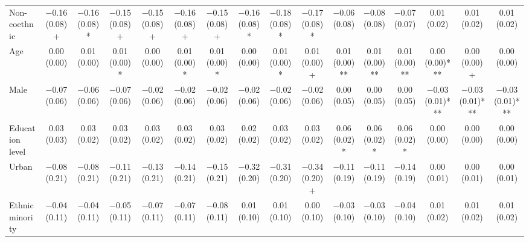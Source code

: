 \begin{table}[H]
\begin{tabular}[t]{lccccccccccccccc}
Non-coethnic & \num{-0.16} (\num{0.08})+ & \num{-0.16} (\num{0.08})* & \num{-0.15} (\num{0.08})+ & \num{-0.15} (\num{0.08})+ & \num{-0.16} (\num{0.08})+ & \num{-0.15} (\num{0.08})+ & \num{-0.16} (\num{0.08})* & \num{-0.18} (\num{0.08})* & \num{-0.17} (\num{0.08})* & \num{-0.06} (\num{0.08}) & \num{-0.08} (\num{0.08}) & \num{-0.07} (\num{0.07}) & \num{0.01} (\num{0.02}) & \num{0.01} (\num{0.02}) & \num{0.01} (\num{0.02})\\
Age & \num{0.00} (\num{0.00}) & \num{0.01} (\num{0.00}) & \num{0.01} (\num{0.00})* & \num{0.00} (\num{0.00}) & \num{0.01} (\num{0.00})* & \num{0.01} (\num{0.00})* & \num{0.00} (\num{0.00}) & \num{0.01} (\num{0.00})* & \num{0.01} (\num{0.00})+ & \num{0.01} (\num{0.00})** & \num{0.01} (\num{0.00})** & \num{0.01} (\num{0.00})** & \num{0.00} (\num{0.00})*** & \num{0.00} (\num{0.00})+ & \num{0.00} (\num{0.00})\\
Male & \num{-0.07} (\num{0.06}) & \num{-0.06} (\num{0.06}) & \num{-0.07} (\num{0.06}) & \num{-0.02} (\num{0.06}) & \num{-0.02} (\num{0.06}) & \num{-0.02} (\num{0.06}) & \num{-0.02} (\num{0.06}) & \num{-0.02} (\num{0.06}) & \num{-0.02} (\num{0.06}) & \num{0.00} (\num{0.05}) & \num{0.00} (\num{0.05}) & \num{0.00} (\num{0.05}) & \num{-0.03} (\num{0.01})*** & \num{-0.03} (\num{0.01})*** & \num{-0.03} (\num{0.01})***\\
Education level & \num{0.03} (\num{0.03}) & \num{0.03} (\num{0.02}) & \num{0.03} (\num{0.02}) & \num{0.03} (\num{0.02}) & \num{0.03} (\num{0.02}) & \num{0.03} (\num{0.02}) & \num{0.02} (\num{0.02}) & \num{0.03} (\num{0.02}) & \num{0.03} (\num{0.02}) & \num{0.06} (\num{0.02})* & \num{0.06} (\num{0.02})* & \num{0.06} (\num{0.02})* & \num{0.00} (\num{0.00}) & \num{0.00} (\num{0.00}) & \num{0.00} (\num{0.00})\\
Urban & \num{-0.08} (\num{0.21}) & \num{-0.08} (\num{0.21}) & \num{-0.11} (\num{0.21}) & \num{-0.13} (\num{0.21}) & \num{-0.14} (\num{0.21}) & \num{-0.15} (\num{0.21}) & \num{-0.32} (\num{0.20}) & \num{-0.31} (\num{0.20}) & \num{-0.34} (\num{0.20})+ & \num{-0.11} (\num{0.19}) & \num{-0.11} (\num{0.19}) & \num{-0.14} (\num{0.19}) & \num{0.00} (\num{0.01}) & \num{0.00} (\num{0.01}) & \num{0.00} (\num{0.01})\\
Ethnic minority & \num{-0.04} (\num{0.11}) & \num{-0.04} (\num{0.11}) & \num{-0.05} (\num{0.11}) & \num{-0.07} (\num{0.11}) & \num{-0.07} (\num{0.11}) & \num{-0.08} (\num{0.11}) & \num{0.01} (\num{0.10}) & \num{0.01} (\num{0.10}) & \num{0.00} (\num{0.10}) & \num{-0.03} (\num{0.10}) & \num{-0.03} (\num{0.10}) & \num{-0.04} (\num{0.10}) & \num{0.01} (\num{0.02}) & \num{0.01} (\num{0.02}) & \num{0.01} (\num{0.02})\\

\end{tabular}
\end{table}
